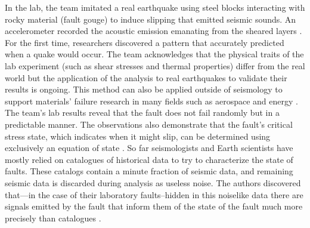 \documentclass[]{llncs} %
\begin{document}
In the lab, the team imitated a real earthquake using steel blocks interacting with rocky material (fault gouge) to induce slipping that emitted seismic sounds. An accelerometer recorded the acoustic emission emanating from the sheared layers \cite{LANLNews}. For the first time, researchers discovered a pattern that accurately predicted when a quake would occur. The team acknowledges that the physical traits of the lab experiment (such as shear stresses and thermal properties) differ from the real world but the application of the analysis to real earthquakes to validate their results is ongoing. This method can also be applied outside of seismology to support materials’ failure research in many fields such as aerospace and energy \cite{LANLNews}. The team’s lab results reveal that the fault does not fail randomly but in a predictable manner. The observations also demonstrate that the fault’s critical stress state, which indicates when it might slip, can be determined using exclusively an equation of state \cite{LANLNews}. So far seismologists and Earth scientists have mostly relied on catalogues of historical data to try to characterize the state of faults. These catalogs contain a minute fraction of seismic data, and remaining seismic data is discarded during analysis as useless noise. The authors discovered that—in the case of their laboratory faults--hidden in this noiselike data there are signals emitted by the fault that inform them of the state of the fault much more precisely than catalogues \cite{LANLNews}. \par
\end{document}
